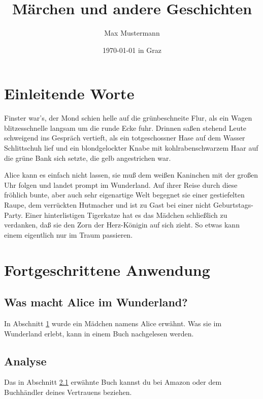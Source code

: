 \documentclass[11pt]{scrartcl}
\title{Märchen und andere Geschichten}
\author{Max Mustermann}
\date{\today{} in Graz}
\begin{document}
\maketitle

\tableofcontents

\section{Einleitende Worte}
\label{sec:einleitende-worte}

Finster war's, der Mond schien helle auf die grünbeschneite Flur, als
ein Wagen blitzesschnelle langsam um die runde Ecke fuhr. Drinnen
saßen stehend Leute schweigend ins Gespräch vertieft, als ein
totgeschossner Hase auf dem Wasser Schlittschuh lief und ein
blondgelockter Knabe mit kohlrabenschwarzem Haar auf die grüne Bank
sich setzte, die gelb angestrichen war.

Alice kann es einfach nicht lassen, sie muß dem weißen Kaninchen mit
der großen Uhr folgen und landet prompt im Wunderland. Auf ihrer Reise
durch diese fröhlich bunte, aber auch sehr eigenartige Welt begegnet
sie einer gestiefelten Raupe, dem verrückten Hutmacher und ist zu Gast
bei einer nicht Geburtstags-Party. Einer hinterlistigen Tigerkatze hat
es das Mädchen schließlich zu verdanken, daß sie den Zorn der
Herz-Königin auf sich zieht. So etwas kann einem eigentlich nur im
Traum passieren.

\section{Fortgeschrittene Anwendung}
\label{sec:fortg-anwend}

\subsection{Was macht Alice im Wunderland?}
\label{sec:was-macht-alice}

In Abschnitt \ref{sec:einleitende-worte} wurde ein Mädchen namens
Alice erwähnt.  Was sie im Wunderland erlebt, kann in einem Buch
nachgelesen werden.

\subsection{Analyse}
\label{sec:analyse}

Das in Abschnitt \ref{sec:was-macht-alice} erwähnte Buch kannst du bei
Amazon oder dem Buchhändler deines Vertrauens beziehen.
\end{document}
